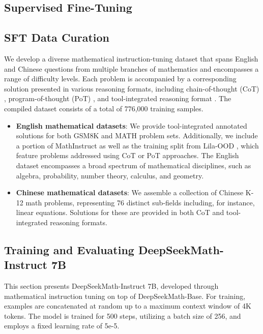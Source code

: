 \begin{itemize}[topsep=0pt]
\section{Supervised Fine-Tuning}

\subsection{SFT Data Curation}

We develop a diverse mathematical instruction-tuning dataset that spans English and Chinese questions from multiple branches of mathematics and encompasses a range of difficulty levels. Each problem is accompanied by a corresponding solution presented in various reasoning formats, including chain-of-thought (CoT) \citep{cot}, program-of-thought (PoT) \citep{pot,pal}, and tool-integrated reasoning format \citep{tora}. The compiled dataset consists of a total of 776,000 training samples.

\begin{itemize}[topsep=0pt]
    \item \textbf{English mathematical datasets}: We provide tool-integrated annotated solutions for both GSM8K and MATH problem sets. Additionally, we include a portion of MathInstruct \citep{MathInstruct} as well as the training split from Lila-OOD \citep{lila}, which feature problems addressed using CoT or PoT approaches. The English dataset encompasses a broad spectrum of mathematical disciplines, such as algebra, probability, number theory, calculus, and geometry.
    \item \textbf{Chinese mathematical datasets}: We assemble a collection of Chinese K-12 math problems, representing 76 distinct sub-fields including, for instance, linear equations. Solutions for these are provided in both CoT and tool-integrated reasoning formats.
\end{itemize}

\subsection{Training and Evaluating DeepSeekMath-Instruct 7B}

This section presents DeepSeekMath-Instruct 7B, developed through mathematical instruction tuning on top of DeepSeekMath-Base. For training, examples are concatenated at random up to a maximum context window of 4K tokens. The model is trained for 500 steps, utilizing a batch size of 256, and employs a fixed learning rate of 5e-5.


\end{itemize}
